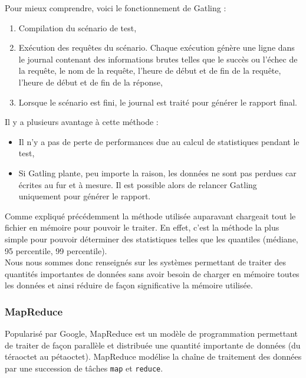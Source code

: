 Pour mieux comprendre, voici le fonctionnement de Gatling :
\begin{enumerate}
 \item Compilation du scénario de test,
 \item Exécution des requêtes du scénario. Chaque exécution génère une ligne dans le journal contenant des informations brutes telles que le succès ou l'échec de la requête, le nom de la requête, l'heure de début et de fin de la requête, l'heure de début et de fin de la réponse,
 \item Lorsque le scénario est fini, le journal est traité pour générer le rapport final.\\
\end{enumerate}

Il y a plusieurs avantage à cette méthode :
\begin{itemize}
 \item Il n'y a pas de perte de performances due au calcul de statistiques pendant le test,
 \item Si Gatling plante, peu importe la raison, les données ne sont pas perdues car écrites au fur et à mesure. Il est possible alors de relancer Gatling uniquement pour générer le rapport.\\
\end{itemize}

Comme expliqué précédemment la méthode utilisée auparavant chargeait tout le fichier en mémoire pour pouvoir le traiter. En effet, c'est la méthode la plus simple pour pouvoir déterminer des statistiques telles que les quantiles (médiane, 95\ieme{} percentile, 99\ieme{} percentile).\\

Nous nous sommes donc renseignés sur les systèmes permettant de traiter des quantités importantes de données sans avoir besoin de charger en mémoire toutes les données et ainsi réduire de façon significative la mémoire utilisée.

\subsubsection{MapReduce}

Popularisé par Google, MapReduce est un modèle de programmation permettant de traiter de façon parallèle et distribuée une quantité importante de données (du téraoctet au pétaoctet). MapReduce modélise la chaîne de traitement des données par une succession de tâches \verb+map+ et \verb+reduce+.\\


